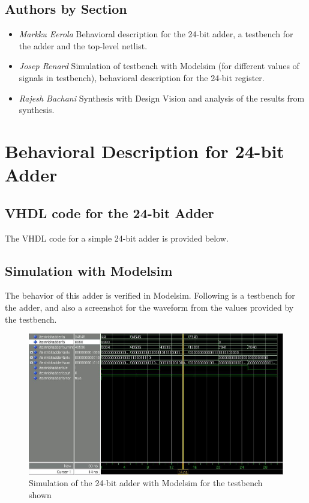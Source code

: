 \documentclass[11pt,a4paper]{article}
\begin{document}
\subsection{Authors by Section}
\begin{itemize}
\item \textit{Markku Eerola} Behavioral description for the 24-bit adder, a testbench for the adder and the top-level netlist.
\item \textit{Josep Renard} Simulation of testbench with Modelsim (for different values of signals in testbench), behavioral description for the 24-bit register.
\item \textit{Rajesh Bachani} Synthesis with Design Vision and analysis of the results from synthesis.
\end{itemize}
\section{Behavioral Description for 24-bit Adder}

\subsection{VHDL code for the 24-bit Adder}
The VHDL code for a simple 24-bit adder is provided below.\\ 


\newpage
\subsection{Simulation with Modelsim}
The behavior of this adder is verified in Modelsim. Following is a testbench for the adder, and also a screenshot for the waveform from the values provided by the testbench.


\newpage
\begin{figure}[htp]
\centering
\includegraphics[width = 6in]{../source/wave.jpg}
\caption{Simulation of the 24-bit adder with Modelsim for the testbench shown}
\end{figure}
\end{document}
